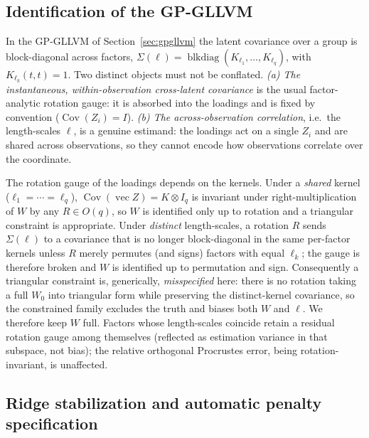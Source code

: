 \documentclass[twoside,11pt]{article}
\begin{document}
\subsection{Identification of the GP-GLLVM}
\label{apx:gp-identification}

In the GP-GLLVM of Section~\ref{sec:gpgllvm} the latent covariance over a group is block-diagonal across factors, $\Sigma(\ell)=\operatorname{blkdiag}(K_{\ell_1},\dots,K_{\ell_q})$, with $K_{\ell_k}(t,t)=1$. Two distinct objects must not be conflated. \emph{(a) The instantaneous, within-observation cross-latent covariance} is the usual factor-analytic rotation gauge: it is absorbed into the loadings and is fixed by convention ($\operatorname{Cov}(Z_i)=I$). \emph{(b) The across-observation correlation}, i.e.\ the length-scales $\ell$, is a genuine estimand: the loadings act on a single $Z_i$ and are shared across observations, so they cannot encode how observations correlate over the coordinate.

The rotation gauge of the loadings depends on the kernels. Under a \emph{shared} kernel ($\ell_1=\cdots=\ell_q$), $\operatorname{Cov}(\operatorname{vec}Z)=K\otimes I_q$ is invariant under right-multiplication of $W$ by any $R\in O(q)$, so $W$ is identified only up to rotation and a triangular constraint is appropriate. Under \emph{distinct} length-scales, a rotation $R$ sends $\Sigma(\ell)$ to a covariance that is no longer block-diagonal in the same per-factor kernels unless $R$ merely permutes (and signs) factors with equal $\ell_k$; the gauge is therefore broken and $W$ is identified up to permutation and sign. Consequently a triangular constraint is, generically, \emph{misspecified} here: there is no rotation taking a full $W_0$ into triangular form while preserving the distinct-kernel covariance, so the constrained family excludes the truth and biases both $W$ and $\ell$. We therefore keep $W$ full. Factors whose length-scales coincide retain a residual rotation gauge among themselves (reflected as estimation variance in that subspace, not bias); the relative orthogonal Procrustes error, being rotation-invariant, is unaffected.


\subsection{Ridge stabilization and automatic penalty specification}
\label{apx:auto-lambda}
\end{document}
